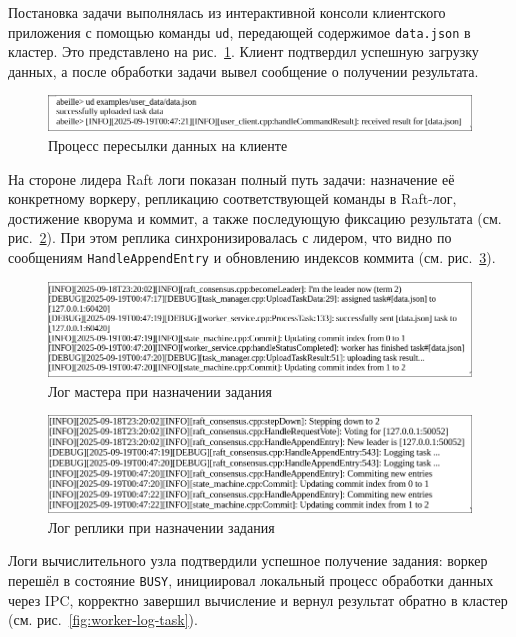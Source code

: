 Постановка задачи выполнялась из интерактивной консоли клиентского приложения с
помощью команды \texttt{ud}, передающей содержимое \texttt{data.json} в
кластер. Это представлено на рис.~\ref{fig:client-send}. Клиент подтвердил
успешную загрузку данных, а после обработки задачи вывел сообщение о получении
результата.

\begin{figure}[h!]
    \centering
    \includegraphics[width=0.8\linewidth]{inc/client-send.png}
    \caption{Процесс пересылки данных на клиенте}
    \label{fig:client-send}
\end{figure}

На стороне лидера Raft логи показан полный путь задачи: назначение её
конкретному воркеру, репликацию соответствующей команды в Raft-лог, достижение
кворума и коммит, а также последующую фиксацию результата (см.
рис.~\ref{fig:master-log-task}). При этом реплика синхронизировалась с лидером,
что видно по сообщениям \texttt{HandleAppendEntry} и обновлению индексов
коммита (см. рис.~\ref{fig:replica-log-task}).

\begin{figure}[h!]
    \centering
    \includegraphics[width=0.8\linewidth]{inc/master-log-task.png}
    \caption{Лог мастера при назначении задания}
    \label{fig:master-log-task}
\end{figure}

\begin{figure}[h!]
    \centering
    \includegraphics[width=0.8\linewidth]{inc/replica-log-task.png}
    \caption{Лог реплики при назначении задания}
    \label{fig:replica-log-task}
\end{figure}

Логи вычислительного узла подтвердили успешное получение задания: воркер перешёл
в состояние \texttt{BUSY}, инициировал локальный процесс обработки данных
через IPC, корректно завершил вычисление и вернул результат обратно в кластер
(см. рис.~\ref{fig:worker-log-task}).


